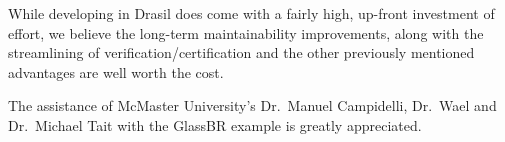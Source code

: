 \documentclass[sigconf]{acmart}
\begin{document}
While developing in Drasil does come with a fairly high, up-front investment of 
effort, we believe the long-term maintainability improvements, along with the 
streamlining of verification/certification and the other previously mentioned 
advantages are well worth the cost.

\begin{acks}
The assistance of McMaster University's Dr.\ Manuel Campidelli, Dr.\ Wael and
Dr.\ Michael Tait with the GlassBR example is greatly appreciated.
\end{acks}


 
\end{document}
